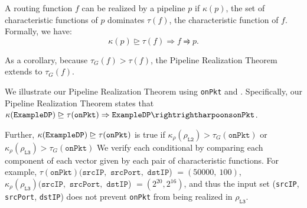 \begin{theorem} A routing function $f$ can be realized by a pipeline $p$ if $\kappa(p)$, the set of characteristic functions of $p$ dominates $\tau(f)$, the characteristic function of $f$. Formally, we have:
\begin{equation*}
\kappa(p) \trianglerighteq \tau(f) \Rightarrow f \rightrightharpoons p.
\end{equation*}
\end{theorem}

As a corollary, because $\tau_G(f) > \tau(f)$, the Pipeline Realization Theorem extends to $\tau_G(f)$.

 We illustrate our Pipeline Realization Theorem using \texttt{onPkt} and \exampledp. Specifically, our Pipeline Realization Theorem states that $\kappa(\exampledp) \trianglerighteq \tau(\texttt{onPkt}) \Rightarrow \exampledp \rightrightharpoons \texttt{onPkt}$.

Further, $\kappa(\texttt{ExampleDP}) \trianglerighteq \tau(\texttt{onPkt})$ is true if $\kappa_\rho(\rho_{\texttt{L2}}) > \tau_G(\texttt{onPkt})$ or $\kappa_\rho(\rho_{\texttt{L3}}) > \tau_G(\texttt{onPkt})$ We verify each conditional by comparing each component of each vector given by each pair of characteristic functions. For example, $\tau(\texttt{onPkt})(\texttt{srcIP},$ $\texttt{srcPort},$ $\texttt{dstIP}$) $ = (50000,\ 100)$,  $\kappa_\rho(\rho_{\texttt{L3}})(\texttt{srcIP},$ $\texttt{srcPort},$ $\texttt{dstIP}$) $ = (2^{20}, 2^{16})$, and thus the input set (\texttt{srcIP}, \texttt{srcPort}, \texttt{dstIP}) does not prevent \texttt{onPkt} from being realized in $\rho_{\texttt{L3}}$.





